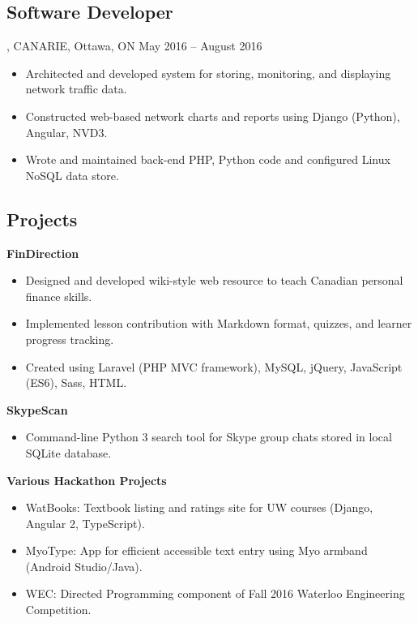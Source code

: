 \documentclass[]{article}
\begin{document}
\subsection{Software Developer}, CANARIE, Ottawa, ON May 2016 -- August 2016

\begin{itemize}
\item
  Architected and developed system for storing, monitoring, and
  displaying network traffic data.
\item
  Constructed web-based network charts and reports using Django
  (Python), Angular, NVD3.
\item
  Wrote and maintained back-end PHP, Python code and configured Linux
  NoSQL data store.
\end{itemize}

\subsection{Projects}

\textbf{FinDirection}

\begin{itemize}
\item
  Designed and developed wiki-style web resource to teach Canadian
  personal finance skills.
\item
  Implemented lesson contribution with Markdown format, quizzes, and
  learner progress tracking.
\item
  Created using Laravel (PHP MVC framework), MySQL, jQuery, JavaScript
  (ES6), Sass, HTML.
\end{itemize}

\textbf{SkypeScan}

\begin{itemize}
\item
  Command-line Python 3 search tool for Skype group chats stored in
  local SQLite database.
\end{itemize}

\textbf{Various Hackathon Projects}

\begin{itemize}
\item
  WatBooks: Textbook listing and ratings site for UW courses (Django,
  Angular 2, TypeScript).
\item
  MyoType: App for efficient accessible text entry using Myo armband
  (Android Studio/Java).
\item
  WEC: Directed Programming component of Fall 2016 Waterloo Engineering
  Competition.
\end{itemize}
\end{document}
